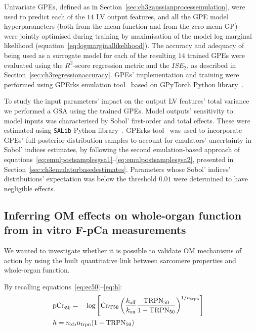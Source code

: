 \vspace{0.2cm}
Univariate GPEs, defined as in Section~\ref{sec:ch3gaussianprocessemulation}, were used to predict each of the $14$ LV output features, and all the GPE model hyperparameters (both from the mean function and from the zero-mean GP) were jointly optimised during training by maximisation of the model log marginal likelihood (equation~\eqref{eq:logmarginallikelihood}). The accuracy and adequacy of being used as a surrogate model for each of the resulting $14$ trained GPEs were evaluated using the $R^2$-score regression metric and the $ISE_2$, as described in Section~\ref{sec:ch3regressionaccuracy}. GPEs' implementation and training were performed using GPErks emulation tool~\cite{GPErks:2021} based on GPyTorch Python library~\cite{Gardner:2019}.

\vspace{0.2cm}
To study the input parameters' impact on the output LV features' total variance we performed a GSA using the trained GPEs. Model outputs' sensitivity to model inputs was characterised by Sobol' first-order and total effects. These were estimated using \texttt{SALib} Python library~\cite{Herman:2017}. GPErks tool~\cite{GPErks:2021} was used to incorporate GPEs' full posterior distribution samples to account for emulators' uncertainty in Sobol' indices estimates, by following the second emulation-based approach of equations~\eqref{eq:emulpostsamplesgsa1}--\eqref{eq:emulpostsamplesgsa2}, presented in Section~\ref{sec:ch3emulatorbasedestimates}. Parameters whose Sobol' indices' distributions' expectation was below the threshold $0.01$ were determined to have negligible effects.




%
%
%
\subsection{Inferring OM effects on whole-organ function from in vitro F-pCa measurements}\label{sec:ch5inferringomeffectswholeorganfpca}
We wanted to investigate whether it is possible to validate OM mechanisms of action by using the built quantitative link between sarcomere properties and whole-organ function.

\vspace{0.2cm}
By recalling equations~\eqref{eq:ec50}--\eqref{eq:h}:
%
\begin{align}
    & \textrm{pCa}_{50} = -\log\left[\textrm{Ca}_{\textrm{T}50}\left(\frac{k_{\textrm{off}}}{k_{\textrm{on}}}\frac{\textrm{TRPN}_{50}}{1-\textrm{TRPN}_{50}}\right)^{1/n_{\textrm{trpn}}}\right] \\
    & h = n_{\textrm{xb}}n_{\textrm{trpn}}(1-\textrm{TRPN}_{50})
\end{align}

